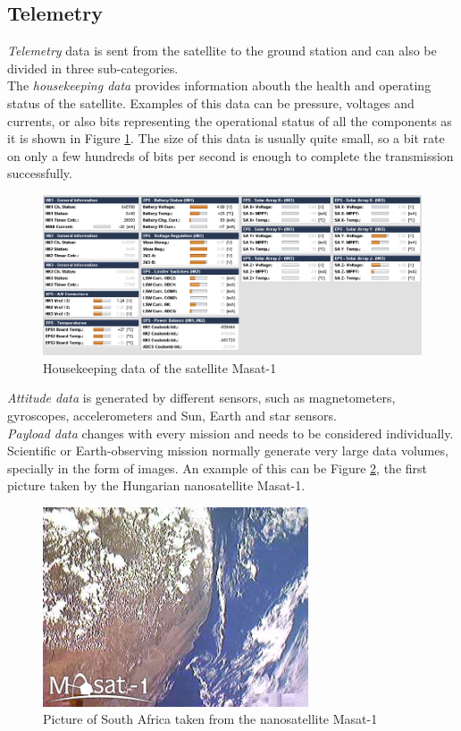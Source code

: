 \subsection{Telemetry}

\emph{Telemetry} data is sent from the satellite to the ground station and can also be divided in three sub-categories.\\

The \emph{housekeeping data} provides information abouth the health and operating status of the satellite. Examples of this data can be pressure, voltages and currents, or also bits representing the operational status of all the components as it is shown in Figure \ref{f2.5}. The size of this data is usually quite small, so a bit rate on only a few hundreds of bits per second is enough to complete the transmission successfully.

\begin{figure}[H]
\centerline{\includegraphics[width=1\textwidth]{images/housekeeping.png}}
\caption{Housekeeping data of the satellite Masat-1}
\label{f2.5}
\end{figure}

\emph{Attitude data} is generated by different sensors, such as magnetometers, gyroscopes, accelerometers and Sun, Earth and star sensors.\\

\emph{Payload data} changes with every mission and needs to be considered individually. Scientific or Earth-observing mission normally generate very large data volumes, specially in the form of images. An example of this can be Figure \ref{f2.6}, the first picture taken by the Hungarian nanosatellite Masat-1\cite{Masat}.

\begin{figure}[H]
\centerline{\includegraphics[width=0.7\textwidth]{images/masat.jpg}}
\caption{Picture of South Africa taken from the nanosatellite Masat-1}
\label{f2.6}
\end{figure}


